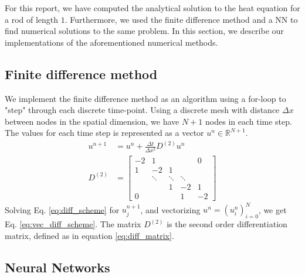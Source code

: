 For this report, we have computed the analytical solution to the heat equation for a rod of length $1$. 
Furthermore, we used the finite difference method and a NN to find numerical solutions to the same problem. 
In this section, we describe our implementations of the aforementioned numerical methods. 

\subsection{Finite difference method}

We implement the finite difference method as an algorithm using a for-loop to "step" through each discrete time-point.
Using a discrete mesh with distance $\Delta x$ between nodes in the spatial dimension,
we have $N+1$ nodes in each time step.
The values for each time step is represented as a vector $u^n \in \mathbb{R}^{N+1}$.
\begin{align}
    \label{eq:vec_diff_scheme}
    u^{n+1} &= u^n + \frac{\Delta t}{\Delta x^2} D^{(2)}u^n \\
    \label{eq:diff_matrix}
    D^{(2)} &= 
    \begin{bmatrix}
    -2  & 1     &       &        &   0    \\
     1 & -2 & 1 &  &        \\
     & \ddots & \ddots & \ddots & \\
      &     & 1 & -2 & 1 \\
     0&           &      & 1     & -2
    \end{bmatrix}
\end{align}
Solving Eq. \ref{eq:diff_scheme} for $u_j^{n+1}$, and vectorizing $u^n = (u^n_i)_{i=0}^N$, we get Eq. \ref{eq:vec_diff_scheme}.
The matrix $D^{(2)}$ is the second order differentiation matrix, defined as in equation \ref{eq:diff_matrix}.

\subsection{Neural Networks}

